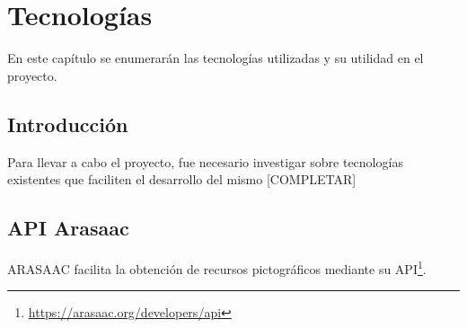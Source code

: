 \chapter{Tecnologías}
\label{cap:introduccion}


\begin{resumen}
	En este capítulo se enumerarán las tecnologías utilizadas y su utilidad en el proyecto.
\end{resumen}

\label{cap1:sec:Motivacion}


\section{Introducción}
Para llevar a cabo el proyecto, fue necesario investigar sobre tecnologías existentes que faciliten el desarrollo del mismo [COMPLETAR]
\section{API Arasaac}
ARASAAC facilita la obtención de recursos pictográficos mediante su API\footnote{\url{https://arasaac.org/developers/api}}. 


